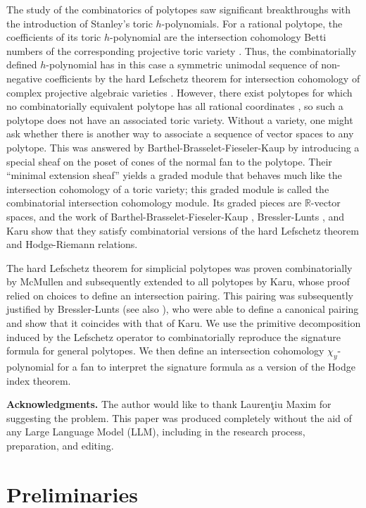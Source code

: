 \documentclass[12pt,leqno,twoside]{amsart}
\begin{document}
        
        The study of the combinatorics of polytopes saw significant breakthroughs with the introduction of Stanley's toric $h$-polynomials. For a rational polytope, the coefficients of its toric $h$-polynomial are the intersection cohomology Betti numbers of the corresponding projective toric variety \cite{S}. Thus, the combinatorially defined $h$-polynomial has in this case a symmetric unimodal sequence of non-negative coefficients by the hard Lefschetz theorem for intersection cohomology of complex projective algebraic varieties \cite{BBD}. However, there exist polytopes for which no combinatorially equivalent polytope has all rational coordinates \cite{Z}, so such a polytope does not have an associated toric variety. Without a variety, one might ask whether there is another way to associate a sequence of vector spaces to any polytope. This was answered by Barthel-Brasselet-Fieseler-Kaup \cite{BBFK} by introducing a special sheaf on the poset of cones of the normal fan to the polytope. Their ``minimal extension sheaf'' yields a graded module that behaves much like the intersection cohomology of a toric variety; this graded module is called the combinatorial intersection cohomology module. Its graded pieces are $\mathbb{R}$-vector spaces, and the work of Barthel-Brasselet-Fieseler-Kaup \cite{BBFK}, Bressler-Lunts \cite{BL}, and Karu \cite{K} show that they satisfy combinatorial versions of the hard Lefschetz theorem and Hodge-Riemann relations. 

        
        The hard Lefschetz theorem for simplicial polytopes was proven combinatorially by McMullen and subsequently extended to all polytopes by Karu, whose proof relied on choices to define an intersection pairing. This pairing was subsequently justified by Bressler-Lunts \cite{BL2} (see also \cite{BBFK3}), who were able to define a canonical pairing and show that it coincides with that of Karu. We use the primitive decomposition induced by the Lefschetz operator to combinatorially reproduce the signature formula for general polytopes. We then define an intersection cohomology  $\chi_y$-polynomial for a fan to interpret the signature formula as a version of the Hodge index theorem.



{\bf Acknowledgments.} The author would like to thank Lauren\c{t}iu Maxim for suggesting the problem. This paper was produced completely without the aid of any Large Language Model (LLM), including in the research process, preparation, and editing.

\section{Preliminaries}
\end{document}
